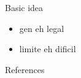 \documentclass[10pt]{beamer}
\begin{document}
\begin{frame}[fragile]{Basic idea}
\begin{itemize}
\item gen eh legal
\item limite eh dificil
\end{itemize}
\end{frame}

\begin{frame}[allowframebreaks]{References}

  
  

\end{frame}
\end{document}
